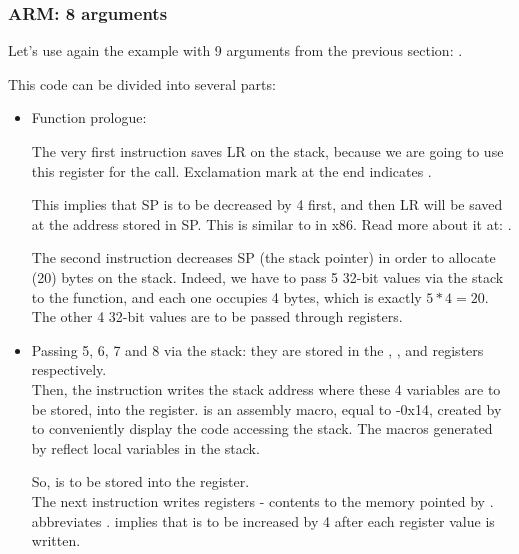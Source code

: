 \subsubsection{ARM: 8 arguments}

Let's use again the example with 9 arguments from the previous section: .



\myparagraph{\OptimizingKeilVI: \ARMMode}



This code can be divided into several parts:

\begin{itemize}
\item Function prologue:

The very first  instruction saves \ac{LR} on the stack, because we are going to use this register for the \printf call.
Exclamation mark at the end indicates .

This implies that \ac{SP} is to be decreased by 4 first, and then \ac{LR} will be saved at the address stored in \ac{SP}.
This is similar to \PUSH in x86.
Read more about it at: .

The second  instruction decreases \ac{SP} (the \gls{stack pointer}) in order to allocate  (20) bytes on the stack.
Indeed, we have to pass 5 32-bit values via the stack to the \printf function, and each one occupies 4 bytes, which is exactly $5*4=20$.
The other 4 32-bit values are to be passed through registers.

\item Passing 5, 6, 7 and 8 via the stack: they are stored in the , ,  and  registers respectively.\\
Then, the  instruction writes the stack address where these 4 variables are to be stored, into the  register.
 is an assembly macro, equal to -0x14, created by \IDA to conveniently display the code accessing the stack.
The  macros generated by \IDA reflect local variables in the stack.

So,  is to be stored into the  register. \\
The next  instruction writes registers - contents to the memory pointed by .
 abbreviates . 
 implies that  is to be increased by 4 after each register value is written.


\end{itemize}
